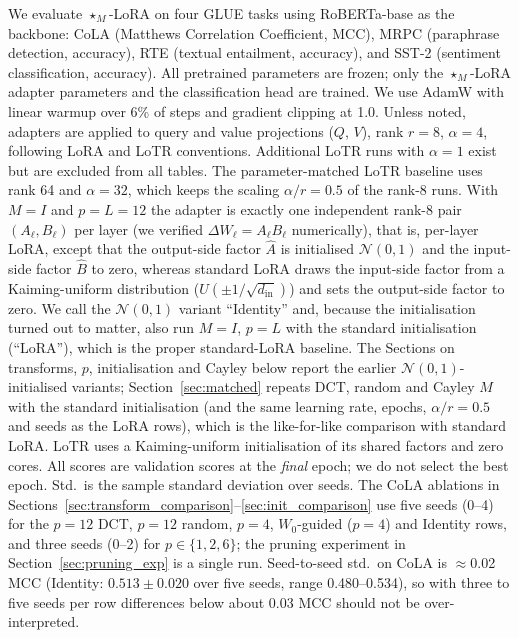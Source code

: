 \documentclass{article}
\theoremstyle{plain}
\begin{document}
We evaluate $\star_M$-LoRA on four GLUE \citep{wang2018glue} tasks using RoBERTa-base
\citep{liu2019roberta} as the backbone:
CoLA (Matthews Correlation Coefficient, MCC),
MRPC (paraphrase detection, accuracy),
RTE (textual entailment, accuracy), and
SST-2 (sentiment classification, accuracy).
All pretrained parameters are frozen; only the $\star_M$-LoRA adapter parameters and the
classification head are trained.
We use AdamW \citep{loshchilov2019adamw} with linear warmup over 6\% of steps
and gradient clipping at 1.0.
Unless noted, adapters are applied to query and value projections ($Q$, $V$),
rank $r=8$, $\alpha=4$, following LoRA and LoTR conventions.
Additional LoTR runs with $\alpha=1$ exist but are excluded from all tables.
The parameter-matched LoTR baseline uses rank 64 and $\alpha=32$, which keeps the scaling $\alpha/r=0.5$ of the
rank-8 runs.
With $M=I$ and $p=L=12$ the adapter is exactly one independent rank-8 pair $(A_\ell, B_\ell)$ per layer
(we verified $\Delta W_\ell = A_\ell B_\ell$ numerically), that is, per-layer LoRA, except that the output-side factor $\hat A$ is initialised
$\mathcal{N}(0,1)$ and the input-side factor $\hat B$ to zero, whereas standard LoRA \citep{hu2022lora} draws the input-side factor from a
Kaiming-uniform distribution ($U(\pm1/\sqrt{d_\mathrm{in}})$) and sets the output-side factor to zero.
We call the $\mathcal{N}(0,1)$ variant ``Identity'' and, because the initialisation turned out to matter, also run $M=I$, $p=L$ with the standard
initialisation (``LoRA''), which is the proper standard-LoRA baseline.
The Sections on transforms, $p$, initialisation and Cayley below report the earlier $\mathcal{N}(0,1)$-initialised variants; Section~\ref{sec:matched} repeats
DCT, random and Cayley $M$ with the standard initialisation (and the same learning rate, epochs, $\alpha/r=0.5$ and seeds as the LoRA rows), which is
the like-for-like comparison with standard LoRA.
LoTR uses a Kaiming-uniform initialisation of its shared factors and zero cores.
All scores are validation scores at the \emph{final} epoch; we do not select the best epoch.
Std.\ is the sample standard deviation over seeds.
The CoLA ablations in Sections~\ref{sec:transform_comparison}--\ref{sec:init_comparison} use five seeds (0--4) for the
$p=12$ DCT, $p=12$ random, $p=4$, $W_0$-guided ($p=4$) and Identity rows, and three seeds (0--2) for
$p\in\{1,2,6\}$; the pruning experiment in Section~\ref{sec:pruning_exp} is a single run.
Seed-to-seed std.\ on CoLA is $\approx$0.02 MCC
(Identity: $0.513\pm0.020$ over five seeds, range 0.480--0.534), so with three to five seeds per row differences
below about 0.03 MCC should not be over-interpreted.
\end{document}
